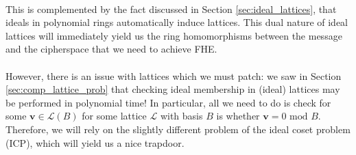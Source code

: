 \documentclass{article}
\theoremstyle{definition}
\theoremstyle{example}
\renewcommand{\L}{\mathcal{L}}
\renewcommand{\mod}{\,\,\text{mod}\,\,}
\renewcommand{\vec}[1]{\mathbf{#1}}
\begin{document}
\paragraph{} This is complemented by the fact discussed in Section
\ref{sec:ideal_lattices}, that ideals in polynomial rings automatically
induce lattices. This dual nature of ideal lattices will immediately yield us
the ring homomorphisms between the message and the cipherspace that we need to
achieve FHE.
\paragraph{} However, there is an issue with lattices which we must patch: we
saw in Section \ref{sec:comp_lattice_prob} that checking ideal membership in
(ideal) lattices may be performed in polynomial time! In particular, all we need
to do is check for some $\vec{v} \in \L(B)$ for some lattice $\L$ with basis $B$
is whether $\vec{v} = 0 \mod B$. Therefore, we will rely on the slightly
different problem of the ideal coset problem (ICP), which will yield us a nice trapdoor.
\end{document}
